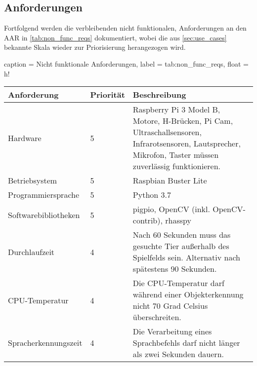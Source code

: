\subsection{Anforderungen}

Fortfolgend werden die verbleibenden nicht funktionalen, Anforderungen an den \ac{AAR} in \autoref{tab:non_func_reqs} dokumentiert, wobei die aus \autoref{sec:use_cases} bekannte Skala wieder zur Priorisierung herangezogen wird.

\begin{dhbwtable}{%
    caption	= Nicht funktionale Anforderungen,
    label	= tab:non_func_reqs,
    float = h!
}
    \begin{tabularx}{\textwidth}{llp{}}
        \toprule
        \textbf{Anforderung}    & \textbf{Priorität} & \textbf{Beschreibung} \\\midrule
        Hardware                & 5 & Raspberry Pi 3 Model B, Motore, H-Brücken, Pi Cam, Ultraschallsensoren, Infrarotsensoren, Lautsprecher, Mikrofon, Taster müssen zuverlässig funktionieren. \\
        Betriebsystem           & 5 & Raspbian Buster Lite \\
        Programmiersprache      & 5 & Python 3.7 \\
        Softwarebibliotheken    & 5 & pigpio, OpenCV (inkl. OpenCV-contrib), rhasspy \\
        Durchlaufzeit           & 4 & Nach 60 Sekunden muss das gesuchte Tier außerhalb des Spielfelds sein. Alternativ nach spätestens 90 Sekunden. \\
        \ac{CPU}-Temperatur     & 4 & Die \ac{CPU}-Temperatur darf während einer Objekterkennung nicht 70 Grad Celsius überschreiten.\\
        Spracherkennungszeit    & 4 & Die Verarbeitung eines Sprachbefehls darf nicht länger als zwei Sekunden dauern.\\\bottomrule
    \end{tabularx}
\end{dhbwtable}